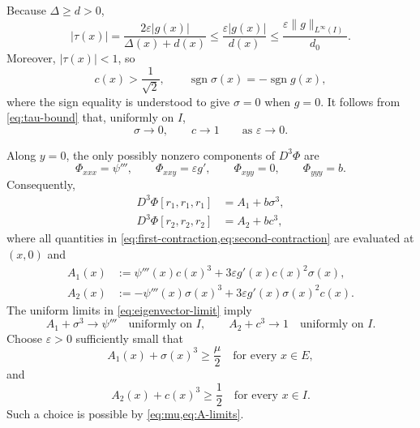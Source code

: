\documentclass[11pt,reqno]{amsart}
\theoremstyle{definition}
\newcommand{\abs}[1]{\lvert#1\rvert}
\newcommand{\norm}[1]{\lVert#1\rVert}
\begin{document}
Because $\Delta\ge d>0$,
\begin{equation}
  \abs{\tau(x)}
  =\frac{2\varepsilon\abs{g(x)}}{\Delta(x)+d(x)}
  \le\frac{\varepsilon\abs{g(x)}}{d(x)}
  \le\frac{\varepsilon\norm{g}_{L^\infty(I)}}{d_0}.
  \label{eq:tau-bound}
\end{equation}
Moreover, $\abs{\tau(x)}<1$, so
\begin{equation}
  c(x)>\frac1{\sqrt2},
  \qquad
  \operatorname{sgn}\sigma(x)=-\operatorname{sgn}g(x),
  \label{eq:c-sigma-sign}
\end{equation}
where the sign equality is understood to give $\sigma=0$ when $g=0$.
It follows from \cref{eq:tau-bound} that, uniformly on $I$,
\begin{equation}
  \sigma\longrightarrow0,
  \qquad
  c\longrightarrow1
  \qquad\text{as }\varepsilon\longrightarrow0.
  \label{eq:eigenvector-limit}
\end{equation}

Along $y=0$, the only possibly nonzero components of $D^3\Phi$ are
\begin{equation}
  \Phi_{xxx}=\psi''',
  \qquad
  \Phi_{xxy}=\varepsilon g',
  \qquad
  \Phi_{xyy}=0,
  \qquad
  \Phi_{yyy}=b.
  \label{eq:third-derivatives-axis}
\end{equation}
Consequently,
\begin{align}
  D^3\Phi[r_1,r_1,r_1]
  &=A_1+b\sigma^3,
  \label{eq:first-contraction}\\
  D^3\Phi[r_2,r_2,r_2]
  &=A_2+bc^3,
  \label{eq:second-contraction}
\end{align}
where all quantities in \cref{eq:first-contraction,eq:second-contraction} are
evaluated at $(x,0)$ and
\begin{align}
  A_1(x)&:=\psi'''(x)c(x)^3
  +3\varepsilon g'(x)c(x)^2\sigma(x),
  \label{eq:A1}\\
  A_2(x)&:=-\psi'''(x)\sigma(x)^3
  +3\varepsilon g'(x)\sigma(x)^2c(x).
  \label{eq:A2}
\end{align}
The uniform limits in \cref{eq:eigenvector-limit} imply
\begin{equation}
  A_1+\sigma^3\longrightarrow\psi'''
  \quad\text{uniformly on }I,
  \qquad
  A_2+c^3\longrightarrow1
  \quad\text{uniformly on }I.
  \label{eq:A-limits}
\end{equation}
Choose $\varepsilon>0$ sufficiently small that
\begin{equation}
  A_1(x)+\sigma(x)^3\ge\frac\mu2
  \quad\text{for every }x\in E,
  \label{eq:epsilon-choice-first}
\end{equation}
and
\begin{equation}
  A_2(x)+c(x)^3\ge\frac12
  \quad\text{for every }x\in I.
  \label{eq:epsilon-choice-second}
\end{equation}
Such a choice is possible by \cref{eq:mu,eq:A-limits}.
\end{document}
